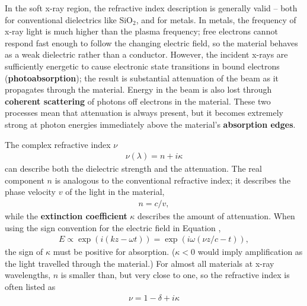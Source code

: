 In the soft x-ray region, the refractive index description is generally valid -- both for conventional dielectrics like SiO$_2$, and for metals.  In metals, the frequency of x-ray light is much higher than the plasma frequency; free electrons cannot respond fast enough to follow the changing electric field, so the material behaves as a weak dielectric rather than a conductor.  However, the incident x-rays are sufficiently energetic to cause electronic state transitions in bound electrons (\textbf{photoabsorption}); the result is substantial attenuation of the beam as it propagates through the material.  Energy in the beam is also lost through \textbf{coherent scattering} of photons off electrons in the material.  These two processes mean that attenuation is always present, but it becomes extremely strong at photon energies immediately above the material's \textbf{absorption edges}.

The complex refractive index $\nu$
\begin{align}
\nu(\lambda) = n + i \kappa
\end{align}
can describe both the dielectric strength and the attenuation.  The real component $n$ is analogous to the conventional refractive index; it describes the phase velocity $v$ of the light in the material,
\begin{align}
n = c / v,
\end{align}
while the \textbf{extinction coefficient }$\kappa$ describes the amount of attenuation.  When using the sign convention for the electric field in Equation ,
\begin{align}
E \propto \exp(i(kz - \omega t)) = \exp(i \omega(\nu z/c - t)),
\end{align}
the sign of $\kappa$ must be positive for absorption.  ($\kappa < 0$ would imply amplification as the light travelled through the material.)
For almost all materials at x-ray wavelengths, $n$ is smaller than, but very close to one, so the refractive index is often listed as
\begin{align}
\nu = 1 - \delta + i \kappa
\end{align}

